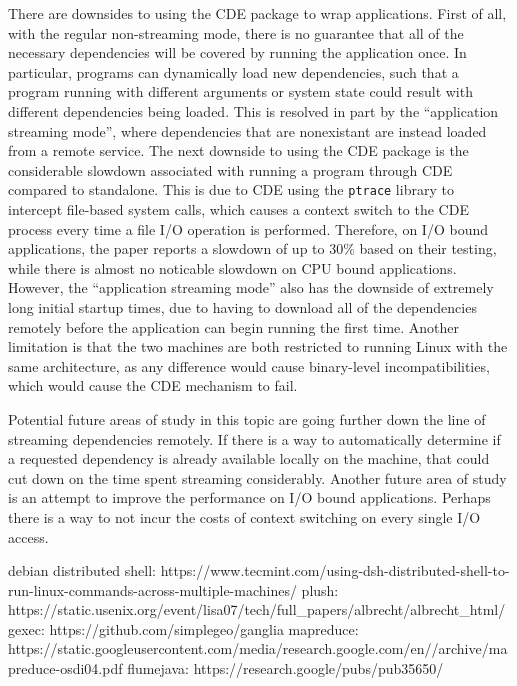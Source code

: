 \documentclass[11pt]{article}
\newcommand{\cde}{\textsc{CDE}\xspace}
\begin{document}
There are downsides to using the \cde package to wrap applications. First of all, with the regular non-streaming mode, there is no guarantee that all of the necessary dependencies will be covered by running the application once. In particular, programs can dynamically load new dependencies, such that a program running with different arguments or system state could result with different dependencies being loaded. This is resolved in part by the ``application streaming mode'', where dependencies that are nonexistant are instead loaded from a remote service. The next downside to using the \cde package is the considerable slowdown associated with running a program through \cde compared to standalone. This is due to \cde using the \texttt{ptrace} library to intercept file-based system calls, which causes a context switch to the \cde process every time a file I/O operation is performed. Therefore, on I/O bound applications, the paper reports a slowdown of up to 30\% based on their testing, while there is almost no noticable slowdown on CPU bound applications. However, the ``application streaming mode'' also has the downside of extremely long initial startup times, due to having to download all of the dependencies remotely before the application can begin running the first time. Another limitation is that the two machines are both restricted to running Linux with the same architecture, as any difference would cause binary-level incompatibilities, which would cause the \cde mechanism to fail.

Potential future areas of study in this topic are going further down the line of streaming dependencies remotely. If there is a way to automatically determine if a requested dependency is already available locally on the machine, that could cut down on the time spent streaming considerably.
Another future area of study is an attempt to improve the performance on I/O bound applications. Perhaps there is a way to not incur the costs of context switching on every single I/O access.

debian distributed shell: https://www.tecmint.com/using-dsh-distributed-shell-to-run-linux-commands-across-multiple-machines/
plush: https://static.usenix.org/event/lisa07/tech/full_papers/albrecht/albrecht_html/
gexec: https://github.com/simplegeo/ganglia
mapreduce: https://static.googleusercontent.com/media/research.google.com/en//archive/mapreduce-osdi04.pdf
flumejava: https://research.google/pubs/pub35650/



\end{document}
